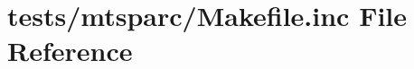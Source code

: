 \hypertarget{tests_2mtsparc_2_makefile_8inc}{\section{tests/mtsparc/\+Makefile.inc File Reference}
\label{tests_2mtsparc_2_makefile_8inc}
}
